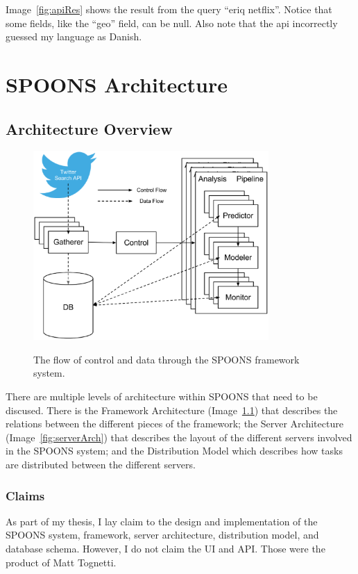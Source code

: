\documentclass[12pt]{ucthesis}
\newcommand{\captionfonts}{\small\bf\ssp}
\begin{document}
Image~\ref{fig:apiRes} shows the result from the query ``eriq netflix''. Notice that some fields,
like the ``geo'' field, can be null. Also note that the api incorrectly guessed my language as Danish.

\chapter{SPOONS Architecture}
\label{arch}

\section{Architecture Overview}
\label{arch-overview}
\begin{figure}
   \begin{center}
      \includegraphics[width=0.8\textwidth]{images/SPOONS_Framework_Architecture.eps}
      \captionfonts
      \caption[SPOONS Framework Architecture]{The flow of control and data through the SPOONS framework system.}
      \label{fig:frameworkArch}
   \end{center}
\end{figure}

There are multiple levels of architecture within SPOONS that need to be discused.
There is the Framework Architecture (Image~\ref{fig:frameworkArch}) that describes the relations between the
different pieces of the framework; the Server Architecture (Image~\ref{fig:serverArch}) that describes the layout of
the different servers involved in the SPOONS system; and the Distribution Model which describes how tasks are
distributed between the different servers.

\subsection{Claims}
\label{arch-claims}
As part of my thesis, I lay claim to the design and implementation of the SPOONS system, framework, server architecture,
distribution model, and database schema. However, I do not claim the UI and API. Those were the product of Matt Tognetti.
\end{document}
